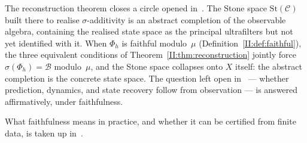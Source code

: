 The reconstruction theorem closes a circle opened in~\cite{mahon_paper1}.
The Stone space $\mathrm{St}(\mathcal{C})$ built there to realise
$\sigma$-additivity is an abstract completion of the observable algebra,
containing the realised state space as the principal ultrafilters but
not yet identified with it.  When $\Phi_h$ is faithful modulo~$\mu$
(Definition~\ref{II:def:faithful}), the three equivalent conditions of
Theorem~\ref{II:thm:reconstruction} jointly force $\sigma(\Phi_h) =
\mathcal{B}$ modulo~$\mu$, and the Stone space collapses onto $X$
itself: the abstract completion is the concrete state space.  The
question left open in~\cite{mahon_paper1} --- whether prediction,
dynamics, and state recovery follow from observation --- is answered
affirmatively, under faithfulness.

What faithfulness means in practice, and whether it can be certified
from finite data, is taken up in~\cite{mahon_paper3}.

\ifstandalone


\fi
